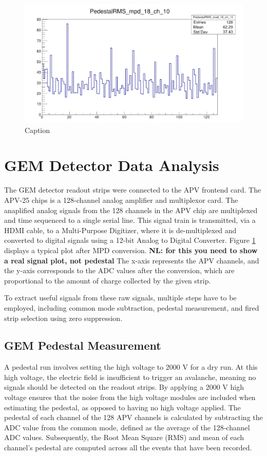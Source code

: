 \begin{figure}
    \centering
    \includegraphics[width=\textwidth]{images/chap5/gem_signal.png}
    \caption{Caption}
    \label{fig:apv_25_pedestal_plot}
\end{figure}

\section{GEM Detector Data Analysis}

The GEM detector readout strips were connected to the APV frontend card. The APV-25 chips is  a 128-channel analog amplifier and multiplexor card. The anaplified analog signals from the 128 channels in the APV chip are multiplexed and time sequenced to a single serial line. This signal train is   transmitted,  via a HDMI cable,  to a Multi-Purpose Digitizer, where it is de-multiplexed and converted to digital signals using a 12-bit Analog to Digital Converter. Figure \ref{fig:apv_25_pedestal_plot} displays a typical plot after MPD conversion. {\bf NL: for this you need to show  a real signal plot, not pedestal} The x-axis represents the APV channels, and the y-axis corresponds to the ADC values after the conversion, which are proportional to the amount  of charge collected by the given strip.

To extract useful signals from these raw signals, multiple steps have to be  employed, including common mode subtraction, pedestal measurement, and fired strip selection using zero suppression.

\subsection{GEM Pedestal Measurement}

A pedestal run involves setting the high voltage to 2000 V for a dry run. At this high voltage, the electric field is insufficient to trigger an avalanche, meaning no signals should be detected on the readout strips. By applying a 2000 V high voltage ensures that  the noise from the high voltage modules  are included  when estimating the pedestal, as opposed to having no high voltage applied. The pedestal of each channel of the 128 APV channels is calculated by subtracting the ADC value from the common mode, defined as the average of the 128-channel ADC values. Subsequently, the Root Mean Square (RMS) and mean of each channel's pedestal are computed across all the events that have been recorded.

